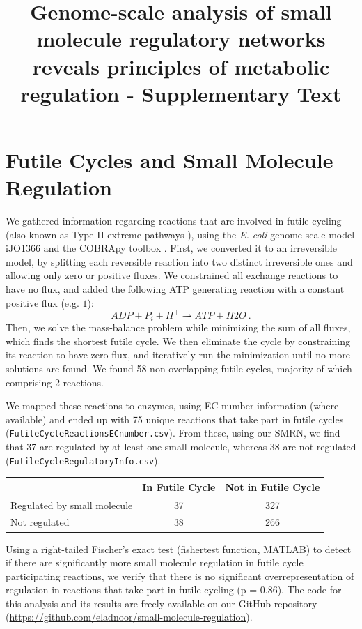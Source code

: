 \documentclass[12pt,a4paper]{article}
\title{Genome-scale analysis of small molecule regulatory networks reveals principles of metabolic regulation - Supplementary Text}
\begin{document}
\maketitle
\tableofcontents
\pagebreak
\section{Futile Cycles and Small Molecule Regulation}
We gathered information regarding reactions that are involved in futile cycling (also known as Type II extreme pathways \cite{Price2002-ef}), using the \emph{E. coli} genome scale model iJO1366 \cite{Orth2011-qi} and the COBRApy toolbox \cite{Ebrahim2013-vw}. First, we converted it to an irreversible model, by splitting each reversible reaction into two distinct irreversible ones and allowing only zero or positive fluxes. We constrained all exchange reactions to have no flux, and added the following ATP generating reaction with a constant positive flux (e.g. $1$):
\begin{equation}
ADP + P_i + H^+ \rightharpoonup ATP + H2O~.
\end{equation}
Then, we solve the mass-balance problem while minimizing the sum of all fluxes, which finds the shortest futile cycle. We then eliminate the cycle by constraining its reaction to have zero flux, and iteratively run the minimization until no more solutions are found. We found 58 non-overlapping futile cycles, majority of which comprising 2 reactions.

We mapped these reactions to enzymes, using EC number information (where available) and ended up with 75 unique reactions that take part in futile cycles (\texttt{FutileCycleReactionsECnumber.csv}). From these, using our SMRN, we find that 37 are regulated by at least one small molecule, whereas 38 are not regulated (\texttt{FutileCycleRegulatoryInfo.csv}).

\begin{center}
\begin{tabular}{|l|c|c|}
	\hline
    & In Futile Cycle & Not in Futile Cycle  \\ \hline
Regulated by small molecule & 37 & 327  \\ \hline
Not regulated & 38 & 266 \\ \hline
\end{tabular}
\end{center}

Using a right-tailed Fischer’s exact test (fishertest function, MATLAB) to detect if there are significantly more small molecule regulation in futile cycle participating reactions, we verify that there is no significant overrepresentation of regulation in reactions that take part in futile cycling (p = 0.86).
The code for this analysis and its results are freely available on our GitHub repository (\url{https://github.com/eladnoor/small-molecule-regulation}).
\end{document}
